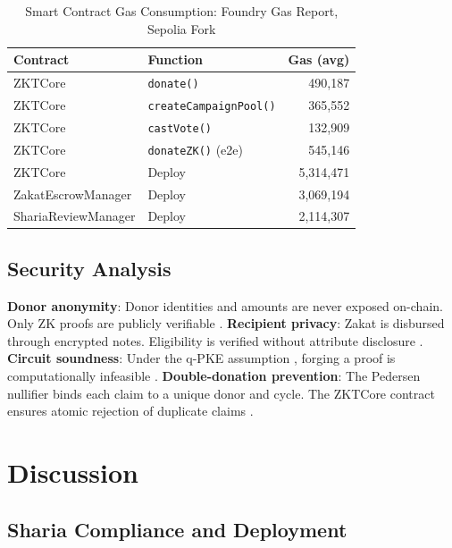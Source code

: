 \documentclass[conference]{IEEEtran}
\begin{document}
\begin{table}[htbp]
\caption{Smart Contract Gas Consumption: Foundry Gas Report, Sepolia Fork}
\label{tab:gas}
\small
\begin{center}
\begin{tabular}{|l|l|r|}
\hline
\textbf{Contract} & \textbf{Function} & \textbf{Gas (avg)} \\
\hline
ZKTCore               & \texttt{donate()}                   & 490,187 \\
ZKTCore               & \texttt{createCampaignPool()}       & 365,552 \\
ZKTCore               & \texttt{castVote()}                 & 132,909 \\
ZKTCore               & \texttt{donateZK()} (e2e)            & 545,146 \\
\hline
ZKTCore               & Deploy                              & 5,314,471 \\
ZakatEscrowManager    & Deploy                              & 3,069,194 \\
ShariaReviewManager   & Deploy                              & 2,114,307 \\
\hline
\end{tabular}
\end{center}
\end{table}

\subsection{Security Analysis}

\textbf{Donor anonymity}: Donor identities and amounts are never exposed on-chain. Only ZK proofs are publicly verifiable \cite{b_aztec,b_zkp_cacm}. \textbf{Recipient privacy}: Zakat is disbursed through encrypted notes. Eligibility is verified without attribute disclosure \cite{b_bbs_w3c}. \textbf{Circuit soundness}: Under the q-PKE assumption \cite{b_zkp_blockchain}, forging a proof is computationally infeasible \cite{b_zkp_vuln}. \textbf{Double-donation prevention}: The Pedersen nullifier binds each claim to a unique donor and cycle. The ZKTCore contract ensures atomic rejection of duplicate claims \cite{b_zkp_idm}.

\section{Discussion}

\subsection{Sharia Compliance and Deployment}
\end{document}
